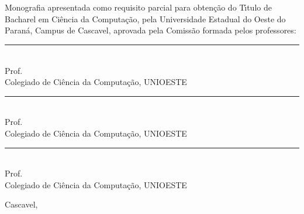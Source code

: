 
\begin{center}
\fontsize{12}{12}
\textbf{\autor}\\
\vspace{3cm}
\fontsize{14}{14}
\textbf{\titulo}\\
\vspace{3cm}
\fontsize{10}{10}
Monografia apresentada como requisito parcial para obten\c{c}\~{a}o do T\'{\i}tulo de Bacharel em Ci\^{e}ncia da Computa\c{c}\~{a}o, pela Universidade Estadual do Oeste do Paran\'{a}, Campus de Cascavel, aprovada pela Comiss\~{a}o formada pelos professores:\\
\vspace{2cm}
\begin{flushright}
\begin{minipage}[10cm] {8.5cm}
\begin{center}
\rule{6cm}{0.01mm}\\
Prof. \orientador\\
Colegiado de Ci\^{e}ncia da Computa\c{c}\~{a}o, UNIOESTE\\
\vspace{1cm}
\rule{6cm}{0.01mm}\\
Prof. \membroA\\
Colegiado de Ci\^{e}ncia da Computa\c{c}\~{a}o, UNIOESTE\\
\vspace{1cm}
\rule{6cm}{0.01mm}\\
Prof. \membroB\\
Colegiado de Ci\^{e}ncia da Computa\c{c}\~{a}o, UNIOESTE\\
\end{center}
\end{minipage}
\end{flushright}
\vspace{3.5cm}
Cascavel, \datalonga
\end{center} 